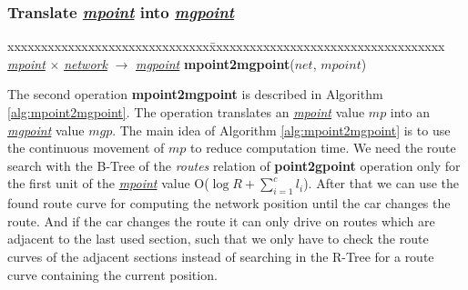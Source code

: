 \documentclass[a4paper]{article}
\newcommand{\op}[1]{\textbf{#1}}
\newcommand{\dt}[1]{\textsl{\underline{#1}}}
\begin{document}
\subsubsection{Translate \dt{mpoint} into \dt{mgpoint}}
\begin{tabbing}
xxxxxxxxxxxxxxxxxxxxxxxxxxxxxx\=xxxxxxxxxxxxxxxxxxxxxxxxxxxxxxxxxxx\kill
\dt{mpoint} $\times$ \dt{network} $\rightarrow$ \dt{mgpoint} \>
\op{mpoint2mgpoint}($net$, $mpoint$)\\
\end{tabbing}
The second operation \op{mpoint2mgpoint} is described in Algorithm 
\ref{alg:mpoint2mgpoint}. The operation translates an \dt{mpoint} value $mp$
into an \dt{mgpoint} value $mgp$. The main idea of Algorithm 
\ref{alg:mpoint2mgpoint} is to use the
continuous movement of $mp$ to reduce computation time. We need the route search
with the B-Tree of the \textit{routes} relation of \op{point2gpoint} operation only for 
the first unit of the \dt{mpoint} value O($\log R + \sum_{i=1}^{c}{l_i}$). 
After that we can use the found route curve
for computing the network position until the car changes the route. And if the
car changes the route it can only drive on routes which are adjacent to the last
used section, such that we only have to check the route curves of the adjacent
sections instead of searching in the R-Tree for a route curve containing the
current position.
\end{document}
